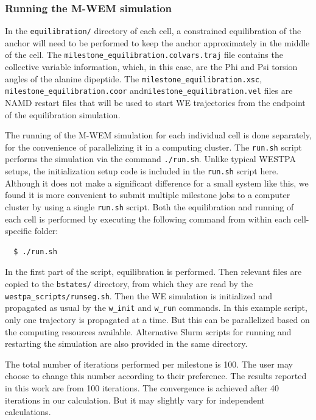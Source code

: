 \subsubsection{Running the M-WEM simulation} In the \verb|equilibration/| directory of each cell, a constrained equilibration of the anchor will need to be performed to keep the anchor approximately in the middle of the cell. 
The \verb|milestone_equilibration.colvars.traj| file contains the collective variable information, which, in this case, are the Phi and Psi torsion angles of the alanine dipeptide. 
The \verb|milestone_equilibration.xsc|, \verb|milestone_equilibration.coor| and\linebreak \verb|milestone_equilibration.vel| files are NAMD restart files that will be used to start WE trajectories from the endpoint of the equilibration simulation. 

The running of the M-WEM simulation for each individual cell is done separately, for the convenience of parallelizing it in a computing cluster. 
The \verb|run.sh| script performs the simulation via the command \verb|./run.sh|.
Unlike typical WESTPA setups, the initialization setup code is included in the \verb|run.sh| script here. 
Although it does not make a significant difference for a small system like this, we found it is more convenient to submit multiple milestone jobs to a computer cluster by using a single \verb|run.sh| script. 
Both the equilibration and running of each cell is performed by executing the following command from within each cell-specific folder:

\begin{verbatim}
  $ ./run.sh
\end{verbatim}

In the first part of the script, equilibration is performed. 
Then relevant files are copied to the \verb|bstates/| directory, from which they are read by the \verb|westpa_scripts/runseg.sh|. 
Then the WE simulation is initialized and propagated as usual by the \verb|w_init| and \verb|w_run| commands. 
In this example script, only one trajectory is propagated at a time. 
But this can be parallelized based on the computing resources available.
Alternative Slurm scripts for running and restarting the simulation are also provided in the same directory.

The total number of iterations performed per milestone is 100. 
The user may choose to change this number according to their preference. 
The results reported in this work are from 100 iterations. 
The convergence is achieved after 40 iterations in our calculation. 
But it may slightly vary for independent calculations.

